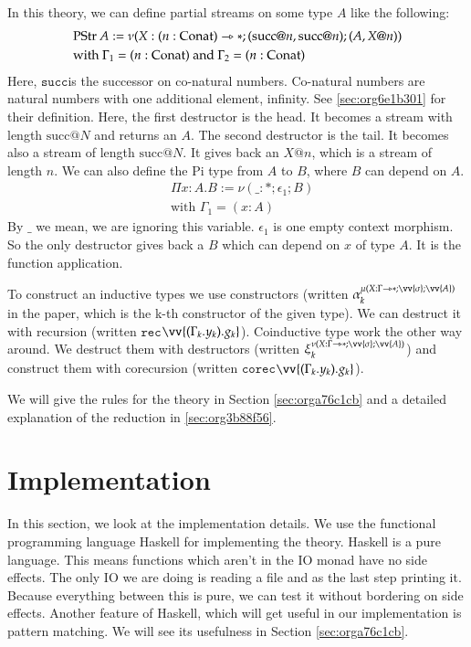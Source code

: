 \documentclass[a4paper,cleardoubleempty,BCOR1cm]{scrbook}
\begin{document}
In this theory, we can define partial streams on some type \(A\) like the following:
\begin{align*}
&\text{PStr }A := \nu(X:(n:\text{Conat})\rightarrowtriangle*;(\text{succ} @ n, \text{succ} @ n);(A, X @ n))\\
&\text{with } \Gamma_1 = (n:\text{Conat}) \text{ and } \Gamma_2 = (n:\text{Conat})
\end{align*}
Here, $\mathtt{succ}$\;is the successor on co-natural numbers.  Co-natural numbers are
natural numbers with one additional element, infinity. See \ref{sec:org6e1b301}
for their definition. Here, the first destructor is the head. It becomes a
stream with length \(\text{succ} @ N\) and returns an \(A\). The second destructor
is the tail. It becomes also a stream of length \(\text{succ} @ N\). It gives
back an \(X @ n\), which is a stream of length \(n\). We can also define the Pi
type from \(A\) to \(B\), where \(B\) can depend on \(A\).
\begin{align*}
&\Pi x:A.B := \nu(\_:*;\epsilon_1;B)\\
&\text{with } \Gamma_1 = (x:A)
\end{align*}
By \(\_\) we mean, we are ignoring this variable. \(\epsilon_1\) is one empty
context morphism.  So the only destructor gives back a \(B\) which can depend
on \(x\) of type \(A\).  It is the function application.

To construct an inductive types we use constructors (written
\(\alpha_k^{\mu(X:\Gamma\rat*;\vv{\sigma};\vv{A})}\) in the paper, which is the k-th
constructor of the given type).  We can destruct it with recursion (written
$\mathtt{rec}$\;\(\vv{(\Gamma_k.y_k).g_k}\)).  Coinductive type work the other way around.
We destruct them with destructors (written
\(\xi_k^{\nu(X:\Gamma\rat*;\vv{\sigma};\vv{A})}\)) and construct them with
corecursion (written $\mathtt{corec}$\;\(\vv{(\Gamma_k.y_k).g_k}\)).

We will give the rules for the theory in Section \ref{sec:orga76c1cb} and a detailed
explanation of the reduction in \ref{sec:org3b88f56}.

\chapter{Implementation}
\label{sec:orgfc63a64}
In this section, we look at the implementation details.  We use the functional
programming language Haskell for implementing the theory. Haskell is a pure
language. This means functions which aren't in the IO monad have no side
effects. The only IO we are doing is reading a file and as the last step
printing it. Because everything between this is pure, we can test it without
bordering on side effects. Another feature of Haskell, which will get
useful in our implementation is pattern matching. We will see its usefulness
in Section \ref{sec:orga76c1cb}.
\end{document}
